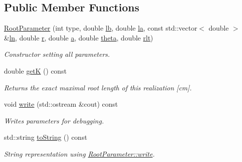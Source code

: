 \subsection*{Public Member Functions}
\begin{DoxyCompactItemize}
\item 
\mbox{\label{classCPlantBox_1_1RootParameter_a4b7f066589b080dd7540126f96836da0}} 
\hyperlink{classCPlantBox_1_1RootParameter_a4b7f066589b080dd7540126f96836da0}{Root\+Parameter} (int type, double \hyperlink{classCPlantBox_1_1RootParameter_a40393811c3e7943f187ddee42d4fac38}{lb}, double \hyperlink{classCPlantBox_1_1RootParameter_a28fb0de51e81766222c87ec71d68314b}{la}, const std\+::vector$<$ double $>$ \&\hyperlink{classCPlantBox_1_1RootParameter_a999299a0b4f326adf683afe5da9423a9}{ln}, double \hyperlink{classCPlantBox_1_1RootParameter_ae17a7206dce49a44a80c6881d778b5fe}{r}, double \hyperlink{classCPlantBox_1_1RootParameter_a766b6f584e93f3e55f82f48a75dc3438}{a}, double \hyperlink{classCPlantBox_1_1RootParameter_af569edd10f2c9bfc3cf45eb2283fc454}{theta}, double \hyperlink{classCPlantBox_1_1RootParameter_a4467193ef1fc618290766b77f801f1f1}{rlt})
\begin{DoxyCompactList}\small\item\em Constructor setting all parameters. \end{DoxyCompactList}\item 
\mbox{\label{classCPlantBox_1_1RootParameter_accbc672b2daf4ed51b92c2568c9eb0e2}} 
double \hyperlink{classCPlantBox_1_1RootParameter_accbc672b2daf4ed51b92c2568c9eb0e2}{getK} () const
\begin{DoxyCompactList}\small\item\em Returns the exact maximal root length of this realization \mbox{[}cm\mbox{]}. \end{DoxyCompactList}\item 
\mbox{\label{classCPlantBox_1_1RootParameter_aed958341f67d2bb36e1480e531732535}} 
void \hyperlink{classCPlantBox_1_1RootParameter_aed958341f67d2bb36e1480e531732535}{write} (std\+::ostream \&cout) const
\begin{DoxyCompactList}\small\item\em Writes parameters for debugging. \end{DoxyCompactList}\item 
\mbox{\label{classCPlantBox_1_1RootParameter_aa999854eadb32eb1ff34cebfa5eb7a0f}} 
std\+::string \hyperlink{classCPlantBox_1_1RootParameter_aa999854eadb32eb1ff34cebfa5eb7a0f}{to\+String} () const
\begin{DoxyCompactList}\small\item\em String representation using \hyperlink{classCPlantBox_1_1RootParameter_aed958341f67d2bb36e1480e531732535}{Root\+Parameter\+::write}. \end{DoxyCompactList}\end{DoxyCompactItemize}
